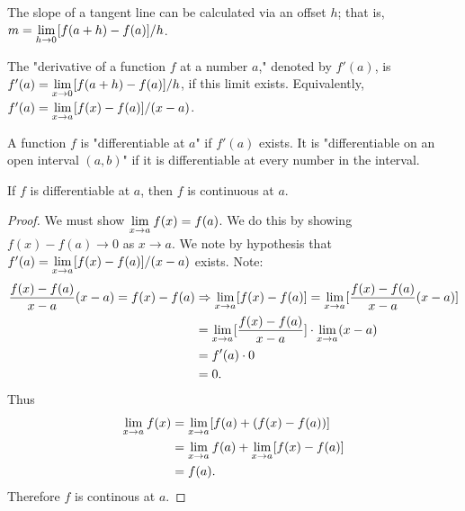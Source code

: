 \documentclass[a4paper,8pt]{article}
\begin{document}
\begin{outline}
    The slope of a tangent line can be calculated via an offset \(h\); that is, \(m = \lim\limits_{h\rightarrow 0^{}}
    [f(a+h)-f(a)]/h\).

    The "derivative of a function \(f\) at a number \(a\)," denoted by \(f'(a)\), is \(f'(a) = \lim\limits_{x\rightarrow 0^{}}
    [f(a+h)-f(a)]/h\), if this limit exists. Equivalently, \(f'(a) = \lim\limits_{x\rightarrow a^{}} [f(x)-f(a)]/(x-a)\).

    A function \(f\) is "differentiable at \(a\)" if \(f'(a)\) exists. It is "differentiable on an open
    interval \((a, b)\)" if it is differentiable at every number in the interval.

    If \(f\) is differentiable at \(a\), then \(f\) is continuous at \(a\).

    \begin{proof}
      We must show \(\lim\limits_{x\rightarrow a^{}} f(x) = f(a)\). We do this by showing \(f(x)-f(a)\rightarrow 0\) as
      \(x \rightarrow a\). We note by hypothesis that \(f'(a) = \lim\limits_{x\rightarrow a^{}} [f(x)-f(a)]/(x-a)\) exists.
      Note:
      \begin{align*}
        \frac{f(x)-f(a)}{x-a}(x-a) = f(x)-f(a)
          &\Rightarrow \lim\limits_{x\rightarrow a^{}} [f(x)-f(a)] = \lim\limits_{x\rightarrow a^{}} [\frac{f(x)-f(a)}{x-a}(x-a)]\\
          &= \lim\limits_{x\rightarrow a^{}}[\frac{f(x)-f(a)}{x-a}] \cdot \lim\limits_{x\rightarrow a^{}} (x-a)\\
          &= f'(a) \cdot 0\\
          &= 0\text{.}
      \end{align*}
      Thus
      \begin{align*}
        \lim\limits_{x\rightarrow a^{}} f(x) &= \lim\limits_{x\rightarrow a^{}}[f(a) + (f(x)-f(a))]\\
                           &= \lim\limits_{x\rightarrow a^{}}f(a) + \lim\limits_{x\rightarrow a^{}}[f(x)-f(a)]\\
                           &= f(a)\text{.}
      \end{align*}
      Therefore \(f\) is continous at \(a\).
    \end{proof}

\end{outline}
\end{document}
